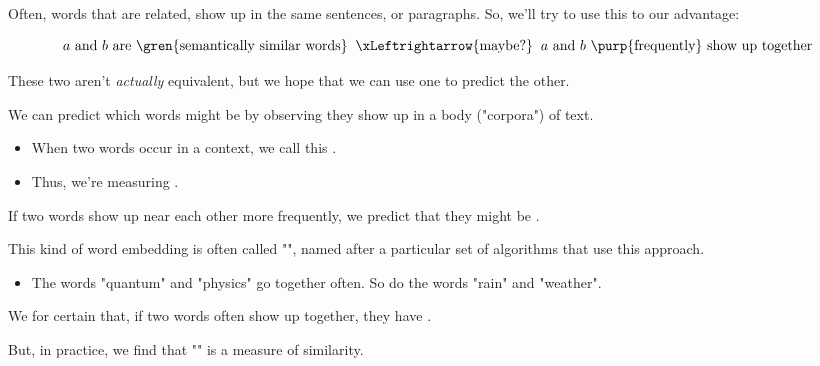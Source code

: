         Often, words that are related, show up in the same sentences, or paragraphs. So, we'll try to use this to our advantage:

        \begin{equation*}
            \text{$a$ and $b$ are \gren{semantically similar words}}
            \;\;\xLeftrightarrow{\text{maybe?}}\;\; 
            \text{$a$ and $b$ \purp{frequently} show up together}
        \end{equation*}

        These two aren't \textit{actually} equivalent, but we hope that we can use one to predict the other.\\

        \begin{concept}
            We can predict which words might be  by observing  they show up  in a body ("corpora") of text.

            \begin{itemize}
                \item When two words occur  in a context, we call this .
                \item Thus, we're measuring .
            \end{itemize}

            If two words show up near each other more frequently, we predict that they might be .

        \end{concept}

        This kind of word embedding is often called "", named after a particular set of algorithms that use this approach.

        \begin{itemize}
            \item \miniex The words "quantum" and "physics" go together often. So do the words "rain" and "weather".\\
        \end{itemize}

        \begin{clarification}
            We  for certain that, if two words often show up together, they have .

            But, in practice, we find that "" is a  measure of similarity.
        \end{clarification}

